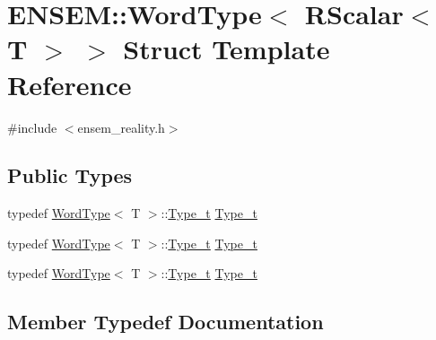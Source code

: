 \hypertarget{structENSEM_1_1WordType_3_01RScalar_3_01T_01_4_01_4}{}\section{E\+N\+S\+EM\+:\+:Word\+Type$<$ R\+Scalar$<$ T $>$ $>$ Struct Template Reference}
\label{structENSEM_1_1WordType_3_01RScalar_3_01T_01_4_01_4}


{\ttfamily \#include $<$ensem\+\_\+reality.\+h$>$}

\subsection*{Public Types}
\begin{DoxyCompactItemize}
\item 
typedef \mbox{\hyperlink{structENSEM_1_1WordType}{Word\+Type}}$<$ T $>$\+::\mbox{\hyperlink{structENSEM_1_1WordType_3_01RScalar_3_01T_01_4_01_4_a348d1b21435dcb68c291fefa3ae5c20c}{Type\+\_\+t}} \mbox{\hyperlink{structENSEM_1_1WordType_3_01RScalar_3_01T_01_4_01_4_a348d1b21435dcb68c291fefa3ae5c20c}{Type\+\_\+t}}
\item 
typedef \mbox{\hyperlink{structENSEM_1_1WordType}{Word\+Type}}$<$ T $>$\+::\mbox{\hyperlink{structENSEM_1_1WordType_3_01RScalar_3_01T_01_4_01_4_a348d1b21435dcb68c291fefa3ae5c20c}{Type\+\_\+t}} \mbox{\hyperlink{structENSEM_1_1WordType_3_01RScalar_3_01T_01_4_01_4_a348d1b21435dcb68c291fefa3ae5c20c}{Type\+\_\+t}}
\item 
typedef \mbox{\hyperlink{structENSEM_1_1WordType}{Word\+Type}}$<$ T $>$\+::\mbox{\hyperlink{structENSEM_1_1WordType_3_01RScalar_3_01T_01_4_01_4_a348d1b21435dcb68c291fefa3ae5c20c}{Type\+\_\+t}} \mbox{\hyperlink{structENSEM_1_1WordType_3_01RScalar_3_01T_01_4_01_4_a348d1b21435dcb68c291fefa3ae5c20c}{Type\+\_\+t}}
\end{DoxyCompactItemize}


\subsection{Member Typedef Documentation}
\mbox{\label{structENSEM_1_1WordType_3_01RScalar_3_01T_01_4_01_4_a348d1b21435dcb68c291fefa3ae5c20c}} 
